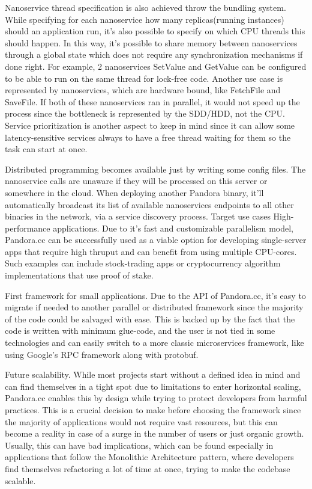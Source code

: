 Nanoservice thread specification is also achieved throw the bundling system. While specifying for each nanoservice how many replicas(running instances) should an application run, it's also possible to specify on which CPU threads this should happen. In this way, it's possible to share memory between nanoservices through a global state which does not require any synchronization mechanisms if done right. For example, 2 nanoservices SetValue and GetValue can be configured to be able to run on the same thread for lock-free code. Another use case is represented by nanoservices, which are hardware bound, like FetchFile and SaveFile. If both of these nanoservices ran in parallel, it would not speed up the process since the bottleneck is represented by the SDD/HDD, not the CPU. Service prioritization is another aspect to keep in mind since it can allow some latency-sensitive services always to have a free thread waiting for them so the task can start at once. 

Distributed programming becomes available just by writing some config files. The nanoservice calls are unaware if they will be processed on this server or somewhere in the cloud. When deploying another Pandora binary, it'll automatically broadcast its list of available nanoservices endpoints to all other binaries in the network, via a service discovery process.
Target use cases
High-performance applications. Due to it's fast and customizable parallelism model, Pandora.cc can be successfully used as a viable option for developing single-server apps that require high thruput and can benefit from using multiple CPU-cores. Such examples can include stock-trading apps or cryptocurrency algorithm implementations that use proof of stake.

First framework for small applications. Due to the API of Pandora.cc, it's easy to migrate if needed to another parallel or distributed framework since the majority of the code could be salvaged with ease. This is backed up by the fact that the code is written with minimum glue-code, and the user is not tied in some technologies and can easily switch to a more classic microservices framework, like using Google's RPC framework along with protobuf.

Future scalability. While most projects start without a defined idea in mind and can find themselves in a tight spot due to limitations to enter horizontal scaling, Pandora.cc enables this by design while trying to protect developers from harmful practices. This is a crucial decision to make before choosing the framework since the majority of applications would not require vast resources, but this can become a reality in case of a surge in the number of users or just organic growth. Usually, this can have bad implications, which can be found especially in applications that follow the Monolithic Architecture pattern, where developers find themselves refactoring a lot of time at once, trying to make the codebase scalable.

